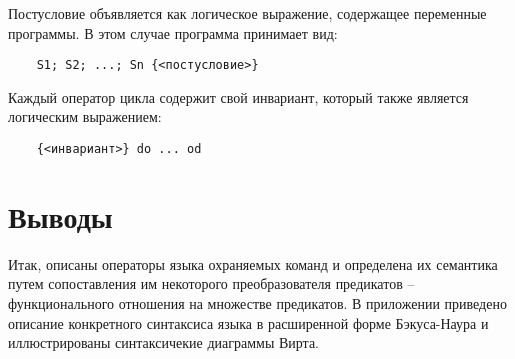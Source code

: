 Постусловие объявляется как логическое выражение, содержащее переменные программы. В этом случае программа
принимает вид:
\begin{verbatim}
	S1; S2; ...; Sn {<постусловие>}
\end{verbatim}

Каждый оператор цикла содержит свой инвариант, который также является логическим выражением:
\begin{verbatim}
	{<инвариант>} do ... od
\end{verbatim}

\section{Выводы} \label{ch2:conclusion}
Итак, описаны операторы языка охраняемых команд и определена их семантика путем
сопоставления им некоторого преобразователя предикатов -- функционального отношения на множестве предикатов.
В приложении приведено описание конкретного синтаксиса языка в расширенной форме Бэкуса-Наура и иллюстрированы синтаксичекие диаграммы Вирта.
%
